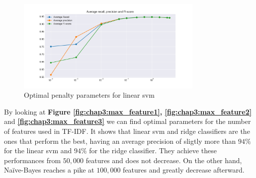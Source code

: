 \begin{figure}
 \centering
 \includegraphics[width=0.8\textwidth]{images/chapitre3/svc_fake}
 \caption{Optimal penalty parameters for linear svm}
 \label{fig:chap3:lsvm2}
\end{figure}
By looking at \textbf{Figure \ref{fig:chap3:max_feature1}, \ref{fig:chap3:max_feature2}} and \textbf{\ref{fig:chap3:max_feature3}} we can find optimal parameters for the number of features used in TF-IDF. It shows that linear svm and ridge classifiers are the ones that perform the best, having an average precision of sligtly more than $94\%$ for the linear svm and $94\%$ for the ridge classifier. They achieve these performances from $50,000$ features and does not decrease. On the other hand, Na\"{i}ve-Bayes reaches a pike at $100,000$ features and greatly decrease afterward. \\

